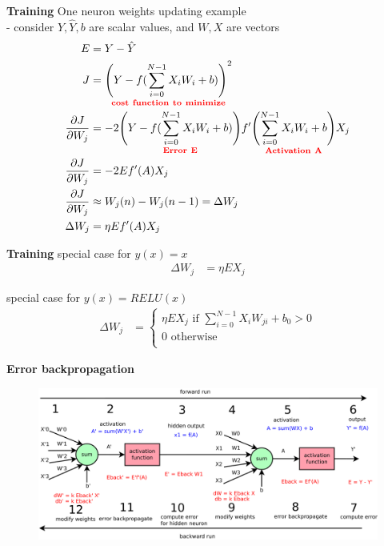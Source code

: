 \documentclass[xcolor=dvipsnames]{beamer}
\begin{document}
\begin{frame}{\bf Training}
One neuron weights updating example \\
- consider $Y, \hat{Y}, b$ are scalar values, and $W, X$ are vectors
\begin{align*}
    E &= Y - \hat{Y} \\
    J &= \underset{\bf \color{red} cost\ function\ to\ minimize}{\left(Y - f(\sum_{i=0}^{N-1} X_iW_i + b) \right)^2} \\
    \frac{\partial J}{\partial W_j} &= -2 \underset{\bf \color{red} Error\ E}{\left(Y - f(\sum_{i=0}^{N-1} X_iW_i + b) \right)}f'\underset{\bf \color{red} Activation\ A}{\left(\sum_{i=0}^{N-1} X_iW_i + b\right)}X_j \\
    \frac{\partial J}{\partial W_j} &= -2Ef'(A)X_j \\
    \frac{\partial J}{\partial W_j} &\approx W_j(n) - W_j(n-1) = \Delta W_j \\
    \Delta W_j &=  \eta Ef'(A)X_j\
\end{align*}
\end{frame}

\begin{frame}{\bf Training}
special case for $y(x) = x$
    \begin{align*}
    \Delta W_j &=  \eta EX_j
    \end{align*}

special case for $y(x) = RELU(x)$
        \begin{align*}
        \Delta W_j &=
        \begin{cases}
            \eta EX_j \text{ if $\sum_{i=0}^{N-1} X_iW_{ji} + b_0 > 0$}\\
            0 \text{ otherwise} \\
        \end{cases}
        \end{align*}
\end{frame}

\begin{frame}{\bf Error backpropagation}

\begin{figure}
  \includegraphics[scale=0.22]{../../diagrams/nn/neuron_backpropagation.png}
\end{figure}

\end{frame}
\end{document}
